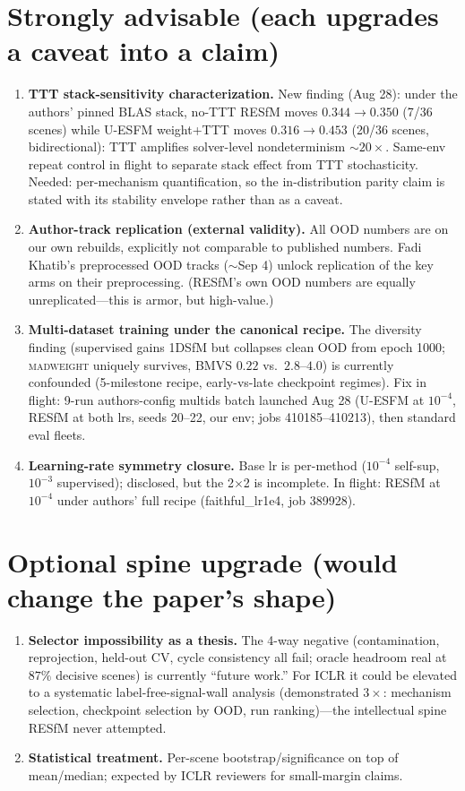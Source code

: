 \documentclass[10pt]{article}
\begin{document}
\section*{Strongly advisable (each upgrades a caveat into a claim)}
\begin{enumerate}[leftmargin=1.4em,resume]
\item \textbf{TTT stack-sensitivity characterization.} New finding (Aug 28): under the
authors' pinned BLAS stack, no-TTT RESfM moves $0.344\!\to\!0.350$ (7/36 scenes) while
U-ESFM weight+TTT moves $0.316\!\to\!0.453$ (20/36 scenes, bidirectional): TTT amplifies
solver-level nondeterminism $\sim\!20\times$. Same-env repeat control in flight to separate
stack effect from TTT stochasticity. Needed: per-mechanism quantification, so the
in-distribution parity claim is stated with its stability envelope rather than as a caveat.
\item \textbf{Author-track replication (external validity).} All OOD numbers are on our own
rebuilds, explicitly not comparable to published numbers. Fadi Khatib's preprocessed OOD
tracks (${\sim}$Sep 4) unlock replication of the key arms on their preprocessing.
(RESfM's own OOD numbers are equally unreplicated---this is armor, but high-value.)
\item \textbf{Multi-dataset training under the canonical recipe.} The diversity finding
(supervised gains 1DSfM but collapses clean OOD from epoch 1000; \textsc{madweight}
uniquely survives, BMVS $0.22$ vs.\ $2.8$--$4.0$) is currently confounded (5-milestone
recipe, early-vs-late checkpoint regimes). Fix in flight: 9-run authors-config multids
batch launched Aug 28 (U-ESFM at $10^{-4}$, RESfM at both lrs, seeds 20--22, our env;
jobs 410185--410213), then standard eval fleets.
\item \textbf{Learning-rate symmetry closure.} Base lr is per-method ($10^{-4}$ self-sup,
$10^{-3}$ supervised); disclosed, but the 2$\times$2 is incomplete. In flight:
RESfM at $10^{-4}$ under authors' full recipe (faithful\_lr1e4, job 389928).
\end{enumerate}

\section*{Optional spine upgrade (would change the paper's shape)}
\begin{enumerate}[leftmargin=1.4em,resume]
\item \textbf{Selector impossibility as a thesis.} The 4-way negative (contamination,
reprojection, held-out CV, cycle consistency all fail; oracle headroom real at $87\%$
decisive scenes) is currently ``future work.'' For ICLR it could be elevated to a
systematic label-free-signal-wall analysis (demonstrated $3\times$: mechanism selection,
checkpoint selection by OOD, run ranking)---the intellectual spine RESfM never attempted.
\item \textbf{Statistical treatment.} Per-scene bootstrap/significance on top of
mean/median; expected by ICLR reviewers for small-margin claims.
\end{enumerate}
\end{document}
